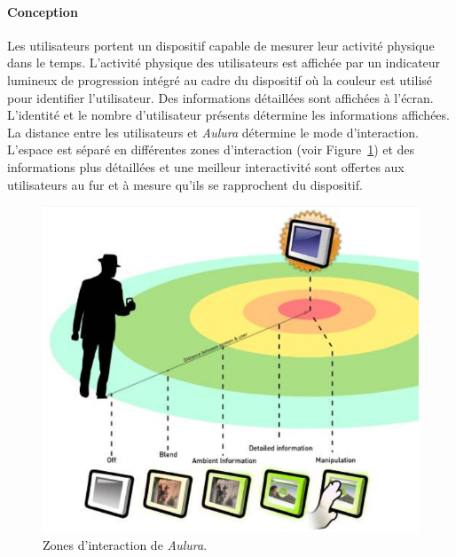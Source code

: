 \documentclass[10pt,a5paper,twoside]{article}
\begin{document}
\paragraph{Conception}\label{conception-3}

Les utilisateurs portent un dispositif capable de mesurer leur activité
physique dans le temps. L'activité physique des utilisateurs est
affichée par un indicateur lumineux de progression intégré au cadre du
dispositif où la couleur est utilisé pour identifier l'utilisateur. Des
informations détaillées sont affichées à l'écran. L'identité et le
nombre d'utilisateur présents détermine les informations affichées. La
distance entre les utilisateurs et \emph{Aulura} détermine le mode
d'interaction. L'espace est séparé en différentes zones d'interaction
(voir Figure~\ref{fig:aulura1}) et des informations plus détaillées et
une meilleur interactivité sont offertes aux utilisateurs au fur et à
mesure qu'ils se rapprochent du dispositif.

\begin{figure}
\centering
\includegraphics[]{images/Aulura-screenshot.png}
\caption{Zones d'interaction de \emph{Aulura}.}\label{fig:aulura1}
\end{figure}
\end{document}
